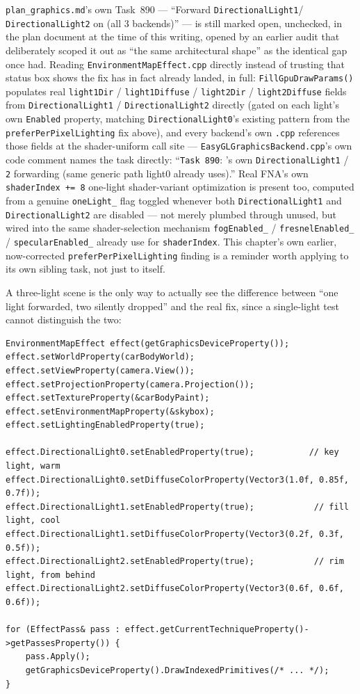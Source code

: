 \texttt{plan\_graphics.md}'s own Task~890 --- ``Forward \texttt{DirectionalLight1}/%
\texttt{DirectionalLight2} on  (all 3 backends)'' --- is still
marked open, unchecked, in the plan document at the time of this writing, opened by an earlier
audit that deliberately scoped it out as ``the same architectural shape'' as the identical gap
 once had. Reading
\texttt{EnvironmentMapEffect.cpp} directly instead of trusting that status box shows the fix has
in fact already landed, in full: \texttt{FillGpuDrawParams()} populates real
\texttt{light1Dir} / \texttt{light1Diffuse} / \texttt{light2Dir} / \texttt{light2Diffuse} fields
from \texttt{DirectionalLight1} / \texttt{DirectionalLight2} directly (gated on each light's own
\texttt{Enabled} property, matching \texttt{DirectionalLight0}'s existing pattern from the
\texttt{preferPerPixelLighting} fix above), and every backend's own \texttt{.cpp} references
those fields at the shader-uniform call site --- \texttt{EasyGLGraphicsBackend.cpp}'s own code
comment names the task directly: ``\texttt{Task 890}: 's own
\texttt{DirectionalLight1} / \texttt{2} forwarding (same generic path light0 already uses).''
Real FNA's own \texttt{shaderIndex += 8} one-light shader-variant optimization is present too,
computed from a genuine \texttt{oneLight\_} flag toggled whenever both \texttt{DirectionalLight1}
and \texttt{DirectionalLight2} are disabled --- not merely plumbed through unused, but wired into
the same shader-selection mechanism \texttt{fogEnabled\_} / \texttt{fresnelEnabled\_} /
\texttt{specularEnabled\_} already use for \texttt{shaderIndex}. This chapter's own earlier,
now-corrected \texttt{preferPerPixelLighting} finding is a reminder worth applying to its own
sibling task, not just to itself.

A three-light scene is the only way to actually see the difference between ``one light forwarded,
two silently dropped'' and the real fix, since a single-light test cannot distinguish the two:

\begin{lstlisting}
EnvironmentMapEffect effect(getGraphicsDeviceProperty());
effect.setWorldProperty(carBodyWorld);
effect.setViewProperty(camera.View());
effect.setProjectionProperty(camera.Projection());
effect.setTextureProperty(&carBodyPaint);
effect.setEnvironmentMapProperty(&skybox);
effect.setLightingEnabledProperty(true);

effect.DirectionalLight0.setEnabledProperty(true);           // key light, warm
effect.DirectionalLight0.setDiffuseColorProperty(Vector3(1.0f, 0.85f, 0.7f));
effect.DirectionalLight1.setEnabledProperty(true);            // fill light, cool
effect.DirectionalLight1.setDiffuseColorProperty(Vector3(0.2f, 0.3f, 0.5f));
effect.DirectionalLight2.setEnabledProperty(true);            // rim light, from behind
effect.DirectionalLight2.setDiffuseColorProperty(Vector3(0.6f, 0.6f, 0.6f));

for (EffectPass& pass : effect.getCurrentTechniqueProperty()->getPassesProperty()) {
    pass.Apply();
    getGraphicsDeviceProperty().DrawIndexedPrimitives(/* ... */);
}
\end{lstlisting}

